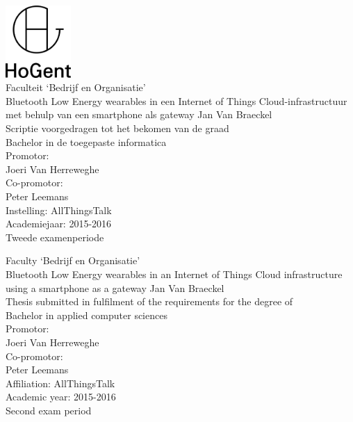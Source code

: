 \documentclass[pdftex,a4paper,12pt,twoside]{report}
\newcommand{\emptypage}{
\newpage
\thispagestyle{empty}
\mbox{}
\newpage
}
\newcommand{\student}{Jan {Van Braeckel}}
\newcommand{\promotor}{Joeri {Van Herreweghe}}
\newcommand{\copromotor}{Peter Leemans}
\newcommand{\instelling}{AllThingsTalk}
\newcommand{\titel}{Bluetooth Low Energy wearables in een Internet of Things Cloud-infrastructuur met behulp van een smartphone als gateway}
\newcommand{\titleEN}{Bluetooth Low Energy wearables in an Internet of Things Cloud infrastructure using a smartphone as a gateway}
\newcommand{\faculteit}{Faculteit `Bedrijf en Organisatie'}
\newcommand{\faculty}{Faculty `Bedrijf en Organisatie'}
\newcommand{\rapporttype}{Scriptie voorgedragen tot het bekomen van de graad\\Bachelor in de toegepaste informatica}
\newcommand{\reporttype}{Thesis submitted in fulfilment of the requirements for the degree of\\Bachelor in applied computer sciences}
\newcommand{\academiejaar}{2015-2016}
\newcommand{\examenperiode}{Tweede examenperiode}
\newcommand{\examperiod}{Second exam period}
\begin{document}

\begin{titlepage}
  \begin{center}

    \begingroup
    \rmfamily
    \includegraphics[width=2.5cm]{img/HG-beeldmerk-woordmerk}\\[.5cm]
    \faculteit\\[3cm]
    \titel
    \vfill
    \student\\[3.5cm]
    \rapporttype\\[2cm]
    Promotor:\\
    \promotor\\
    Co-promotor:\\
    \copromotor\\[2.5cm]
    Instelling: \instelling\\[.5cm]
    Academiejaar: \academiejaar\\[.5cm]
    \examenperiode
    \endgroup

  \end{center}
  \restoregeometry
\end{titlepage}


\emptypage
\emptypage
\emptypage


\begin{titlepage}
  \begin{center}

    \begingroup
    \rmfamily
    \faculty\\[3cm]
    \titleEN
    \vfill
    \student\\[3.5cm]
    \reporttype\\[2cm]
    Promotor:\\
    \promotor\\
    Co-promotor:\\
    \copromotor\\[2.5cm]
    Affiliation: \instelling\\[.5cm]
    Academic year: \academiejaar\\[.5cm]
    \examperiod
    \endgroup

  \end{center}
  \restoregeometry
\end{titlepage}
\end{document}
